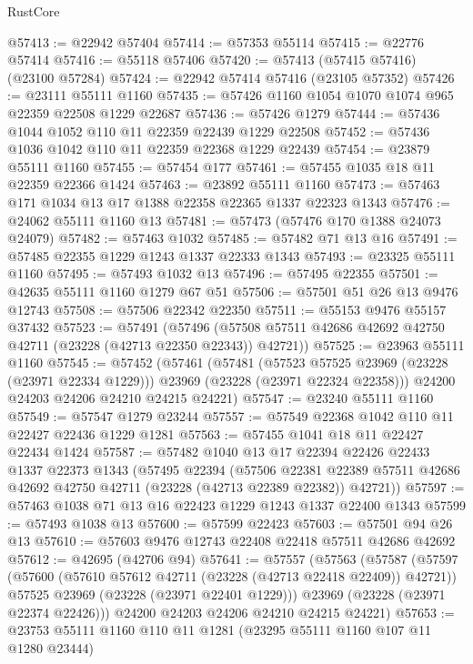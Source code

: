 \begin{lexlean}{RustCore}
\begin{coremodule}
@57413 := @22942 @57404
@57414 := @57353 @55114
@57415 := @22776 @57414
@57416 := @55118 @57406
@57420 := @57413 (@57415 @57416) (@23100 @57284)
@57424 := @22942 @57414 @57416 (@23105 @57352)
@57426 := @23111 @55111 @1160
@57435 := @57426 @1160 @1054 @1070 @1074 @965 @22359 @22508 @1229 @22687
@57436 := @57426 @1279
@57444 := @57436 @1044 @1052 @110 @11 @22359 @22439 @1229 @22508
@57452 := @57436 @1036 @1042 @110 @11 @22359 @22368 @1229 @22439
@57454 := @23879 @55111 @1160
@57455 := @57454 @177
@57461 := @57455 @1035 @18 @11 @22359 @22366 @1424
@57463 := @23892 @55111 @1160
@57473 := @57463 @171 @1034 @13 @17 @1388 @22358 @22365 @1337 @22323 @1343
@57476 := @24062 @55111 @1160 @13
@57481 := @57473 (@57476 @170 @1388 @24073 @24079)
@57482 := @57463 @1032
@57485 := @57482 @71 @13 @16
@57491 := @57485 @22355 @1229 @1243 @1337 @22333 @1343
@57493 := @23325 @55111 @1160
@57495 := @57493 @1032 @13
@57496 := @57495 @22355
@57501 := @42635 @55111 @1160 @1279 @67 @51
@57506 := @57501 @51 @26 @13 @9476 @12743
@57508 := @57506 @22342 @22350
@57511 := @55153 @9476 @55157 @37432
@57523 := @57491
    (@57496 (@57508 @57511 @42686 @42692 @42750 @42711 (@23228 (@42713 @22350 @22343)) @42721))
@57525 := @23963 @55111 @1160
@57545 := @57452
    (@57461
      (@57481
        (@57523 @57525 @23969 (@23228 (@23971 @22334 @1229)))
        @23969
        (@23228 (@23971 @22324 @22358)))
      @24200
      @24203
      @24206
      @24210
      @24215
      @24221)
@57547 := @23240 @55111 @1160
@57549 := @57547 @1279 @23244
@57557 := @57549 @22368 @1042 @110 @11 @22427 @22436 @1229 @1281
@57563 := @57455 @1041 @18 @11 @22427 @22434 @1424
@57587 := @57482
    @1040
    @13
    @17
    @22394
    @22426
    @22433
    @1337
    @22373
    @1343
    (@57495
      @22394
      (@57506
        @22381
        @22389
        @57511
        @42686
        @42692
        @42750
        @42711
        (@23228 (@42713 @22389 @22382))
        @42721))
@57597 := @57463 @1038 @71 @13 @16 @22423 @1229 @1243 @1337 @22400 @1343
@57599 := @57493 @1038 @13
@57600 := @57599 @22423
@57603 := @57501 @94 @26 @13
@57610 := @57603 @9476 @12743 @22408 @22418 @57511 @42686 @42692
@57612 := @42695 (@42706 @94)
@57641 := @57557
    (@57563
      (@57587
        (@57597
          (@57600 (@57610 @57612 @42711 (@23228 (@42713 @22418 @22409)) @42721))
          @57525
          @23969
          (@23228 (@23971 @22401 @1229)))
        @23969
        (@23228 (@23971 @22374 @22426)))
      @24200
      @24203
      @24206
      @24210
      @24215
      @24221)
@57653 := @23753 @55111 @1160 @110 @11 @1281 (@23295 @55111 @1160 @107 @11 @1280 @23444)

\end{coremodule}
\end{lexlean}
